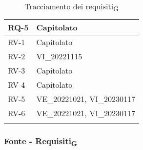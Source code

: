 \begin{center}
\begin{xltabular}{\textwidth}{|X|X|}
		\hline
		RQ-5 & Capitolato\\
		\hline
		RV-1 & Capitolato\\
		\hline
		RV-2 & VI\_20221115\\
		\hline
		RV-3 & Capitolato\\
		\hline
		RV-4 & Capitolato\\
		\hline
		RV-5 & VE\_20221021, VI\_20230117\\
		\hline
		RV-6 & VE\_20221021, VI\_20230117\\
		\hline
		\caption{Tracciamento dei requisiti\textsubscript{G}}
	\end{xltabular}
\end{center}

\subsubsection{Fonte - Requisiti\textsubscript{G}}
